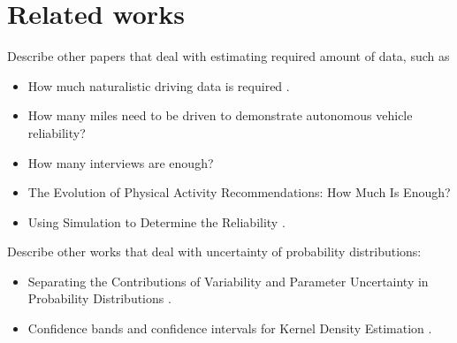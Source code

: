 \section{Related works}
\label{sec:related}

\color{red}

Describe other papers that deal with estimating required amount of data, such as
\begin{itemize}
	\item How much naturalistic driving data is required \cite{wang2017much}.
	\item How many miles need to be driven to demonstrate autonomous vehicle reliability? \cite{kalra2016driving}
	\item How many interviews are enough? \cite{guest2006many}
	\item The Evolution of Physical Activity Recommendations: How Much Is Enough? \cite{blair2004evolution}
	\item Using Simulation to Determine the Reliability \cite{marks2018howmuch}.
\end{itemize}

Describe other works that deal with uncertainty of probability distributions:
\begin{itemize}
	\item Separating the Contributions of Variability and Parameter Uncertainty in Probability Distributions \cite{sankararaman2013separating}.
	\item Confidence bands and confidence intervals for Kernel Density Estimation \cite{chen2017tutorial}.
\end{itemize}

\color{black}

